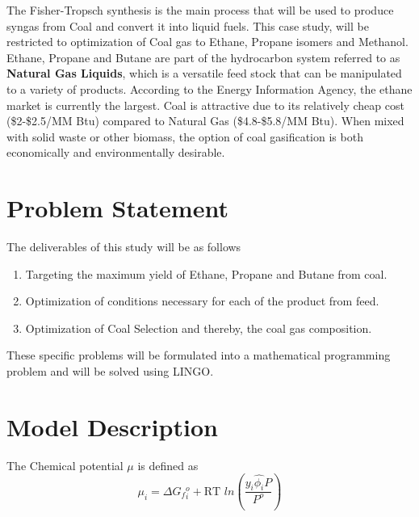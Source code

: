\documentclass[journal=iecred,manuscript=article]{achemso}
\begin{document}
The Fisher-Tropsch synthesis is the main process that will be used to produce syngas from Coal and convert it into liquid fuels. This case study, will be restricted  to optimization of Coal gas to Ethane, Propane isomers and Methanol. Ethane, Propane and Butane are part of the hydrocarbon system referred to as \textbf{Natural Gas Liquids}, which is a versatile feed stock that can be manipulated to a variety of products. According to the Energy Information Agency\cite{eia}, the ethane market is currently the largest. Coal is attractive due to its relatively cheap cost (\$2-\$2.5/MM Btu) compared to Natural Gas (\$4.8-\$5.8/MM Btu)\cite{econ}. When mixed with solid waste or other biomass, the option of coal gasification is both economically and environmentally desirable\cite{Floudas201016}.\\ 

\section*{Problem Statement}
The deliverables of this study will be as follows

\begin{enumerate}
\item Targeting the maximum yield of Ethane, Propane and Butane from coal.

\item Optimization of conditions necessary for each of the product from feed.

\item Optimization of Coal Selection and thereby, the coal gas composition.

\end{enumerate}

These specific problems will be formulated into a mathematical programming problem and will be solved using LINGO\textsuperscript{\textregistered}.   

\section*{Model Description}
The Chemical potential $\mu$ is defined as  
\begin{equation}
\mu_i = {\Delta G_f{}_i^o} + \textrm{RT } ln( \frac{y_i\hat{\phi_i}P}{P^o})
\end{equation}
\end{document}
